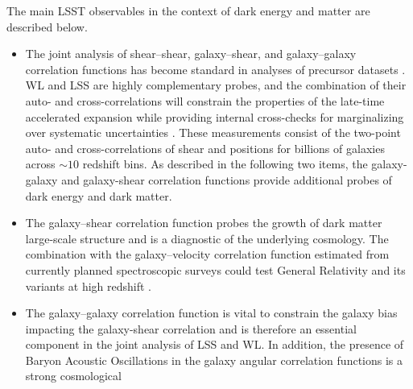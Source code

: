 The main LSST observables in the context of dark energy and matter are described below.

\begin{itemize}
\item The
joint analysis of shear--shear, galaxy--shear, and galaxy--galaxy
correlation functions has become standard in analyses of precursor datasets
\cite[e.g.][]{2017arXiv170801530D,2017arXiv170706627J}. WL and LSS are highly complementary probes, and the combination
of their auto- and cross-correlations will constrain the properties of the late-time accelerated expansion while providing
internal cross-checks for marginalizing over systematic uncertainties \cite[e.g.,][]{2017arXiv171003235M}.
These measurements consist of the two-point auto- and cross-correlations of shear and positions for billions of galaxies across $\sim 10$ redshift bins.
As described in the following two items, the galaxy-galaxy and galaxy-shear correlation functions provide additional probes of dark energy and dark matter.
%
%
\item The galaxy--shear correlation function probes the growth of dark matter large-scale structure and is a
diagnostic of the underlying cosmology. The combination with the
galaxy--velocity correlation function estimated from currently planned
spectroscopic surveys
could test General Relativity and its variants at high redshift \citep{2010Natur.464..256R}.
%
\item The galaxy--galaxy correlation function is vital to constrain the galaxy bias impacting the galaxy-shear correlation and is therefore
an essential component in the joint analysis of LSS and WL. In addition, the presence of
Baryon Acoustic Oscillations in the galaxy angular correlation functions is a strong cosmological

\end{itemize}
